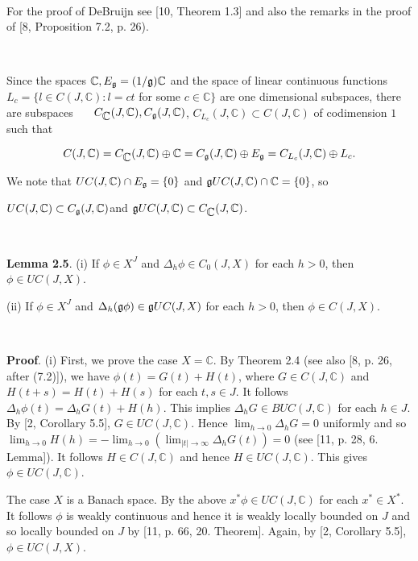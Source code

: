 \documentclass[10pt,onside,reqno]{amsart}
\newcommand{\Cdb}{\mbox{$\mathbb{C}$}}
\theoremstyle{remark}
\theoremstyle{definition}
\begin{document}
\

\noindent For the proof  of DeBruijn see
 [10, Theorem 1.3] and also the remarks in the proof of [8, Proposition 7.2, p. 26).

\

Since  the spaces $\Cdb, E_{\frak{g}}= (1/\frak{g})\Cdb$ and the space of linear continuous functions  $L_c = \{ l\in C (J,\Cdb): l= ct$ for some $c\in \Cdb\}$ are one dimensional subspaces, there are   subspaces  \,\, \,\,\, $C_{\Cdb}(J,\Cdb), C_{\frak{g}} (J,\Cdb)$,
\newline $C_{L_c} (J,\Cdb) \subset C (J,\Cdb)$ of codimension $1$ such that

\begin{equation}
C (J,\Cdb) = C_{\Cdb}(J,\Cdb)\oplus\Cdb = C_{\frak{g}} (J,\Cdb)\oplus E_{ \frak{g}} =  C_{L_c} (J,\Cdb)\oplus L_c.
\end{equation}


\noindent We note that $U C (J,\Cdb)\cap E_{\frak{g}}=\{0\}$ and $\frak{g} U C (J,\Cdb)\cap \Cdb=\{0\}$, so

 $U C (J,\Cdb) \subset  C_{\frak{g}} (J,\Cdb)$\quad  and \quad
 $\frak{g}U C (J,\Cdb)\subset C_{\Cdb}(J,\Cdb) $.

\

\noindent\textbf{Lemma 2.5}.  (i) If $ \phi\in X^J$ and  $\Delta_h \phi \in C_0 (J,X)$ for each $ h >0$, then $\phi\in UC(J,X)$.

(ii)  If $ \phi\in X^J$ and  $\Delta_h (\frak{g} \phi) \in\frak{g}  UC (J,X)$ for each $ h >0$, then $\phi\in C(J,X)$.

\

\noindent\textbf{Proof}.
(i) First, we prove the case $X=\Cdb$. By  Theorem 2.4 (see
 also [8, p. 26, after (7.2)]), we have $\phi (t) = G(t)+ H(t)$, where $G\in C(J,\Cdb)$ and $H (t+s)=H(t) +H(s)$ for each $t, s \in J$. It follows
$\Delta_h \phi (t)= \Delta_h G (t) + H(h)$. This implies $\Delta_h G \in BUC(J,\Cdb)$ for each $h \in J$. By [2, Corollary 5.5], $G\in UC(J,\Cdb)$.
Hence $\lim _{h\to 0}\Delta _h G=0$ uniformly and so  $\lim_{h\to 0} H(h)= -\lim_{h\to 0}(\lim_{|t|\to \infty}\Delta_ h G (t))
=0$ (see [11, p. 28, 6. Lemma]). It follows $H\in C(J,\Cdb)$ and hence $H\in UC(J,\Cdb)$. This gives $\phi \in UC(J,\Cdb)$.

The case $X$ is a Banach space. By the above $x^* \phi \in UC(J,\Cdb)$ for each $x^* \in X^*$.   It follows $\phi$ is weakly continuous and hence it is weakly locally bounded on $J$ and so locally bounded on $J$  by [11, p. 66, 20. Theorem]. Again, by [2, Corollary 5.5], $\phi \in UC(J,X)$.
\end{document}
